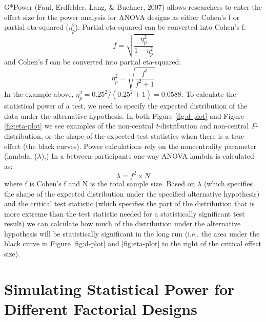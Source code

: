 \documentclass[,jou,floatsintext]{apa6}
\begin{document}
G*Power (Faul, Erdfelder, Lang, \& Buchner, 2007) allows researchers to enter the effect size for the power analysis for ANOVA designs as either Cohen's f or partial eta-squared (\(\eta_p^2\)).
Partial eta-squared can be converted into Cohen's f:
\begin{equation}
f = \sqrt{\frac{\eta_p^2}{1-\eta_p^2}} \label{eq:eta-to-f}
\end{equation}
and Cohen's f can be converted into partial eta-squared:
\begin{equation}
\eta_p^2 = \sqrt{\frac{f^2}{f^2+1}} \label{eq:f-to-eta}
\end{equation}
In the example above, \(\eta_p^2 = 0.25^2/(0.25^2+1) = 0.0588\).
To calculate the statistical power of a test, we need to specify the expected distribution of the data under the alternative hypothesis.
In both Figure \ref{fig:d-plot} and Figure \ref{fig:eta-plot} we see examples of the non-central \emph{t}-distribution and non-central \emph{F}-distribution, or the shape of the expected test statistics when there is a true effect (the black curves).
Power calculations rely on the noncentrality parameter (lambda, (\(\lambda\)).)
In a between-participants one-way ANOVA lambda is calculated as:
\begin{equation}
\lambda = f^2 \times N \label{eq:lambda}
\end{equation}
where f is Cohen's f and N is the total sample size.
Based on \(\lambda\) (which specifies the shape of the expected distribution under the specified alternative hypothesis) and the critical test statistic (which specifies the part of the distribution that is more extreme than the test statistic needed for a statistically significant test result) we can calculate how much of the distribution under the alternative hypothesis will be statistically significant in the long run (i.e., the area under the black curve in Figure \ref{fig:d-plot} and \ref{fig:eta-plot} to the right of the critical effect size).

\hypertarget{simulating-statistical-power-for-different-factorial-designs}{%
\section{Simulating Statistical Power for Different Factorial Designs}\label{simulating-statistical-power-for-different-factorial-designs}}
\end{document}
